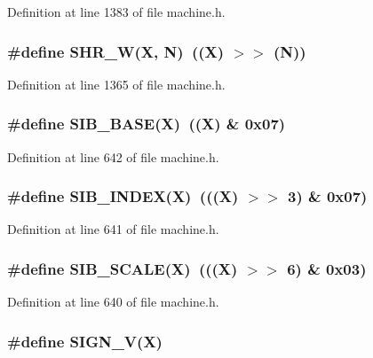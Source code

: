 Definition at line 1383 of file machine.h.
\subsubsection[{SHR\_\-W}]{\setlength{\rightskip}{0pt plus 5cm}\#define SHR\_\-W(X, \/  N)~((X) $>$$>$ (N))}\label{machine_8h_cb13dcce0ac5ee1b827044c4bdcb8525}




Definition at line 1365 of file machine.h.
\subsubsection[{SIB\_\-BASE}]{\setlength{\rightskip}{0pt plus 5cm}\#define SIB\_\-BASE(X)~((X) \& 0x07)}\label{machine_8h_de13ecc82253b38c787f765bc05ffcb6}




Definition at line 642 of file machine.h.
\subsubsection[{SIB\_\-INDEX}]{\setlength{\rightskip}{0pt plus 5cm}\#define SIB\_\-INDEX(X)~(((X) $>$$>$ 3) \& 0x07)}\label{machine_8h_9fa465ac29c1acd47dbbc4e2ef62c5be}




Definition at line 641 of file machine.h.
\subsubsection[{SIB\_\-SCALE}]{\setlength{\rightskip}{0pt plus 5cm}\#define SIB\_\-SCALE(X)~(((X) $>$$>$ 6) \& 0x03)}\label{machine_8h_e07e81496112bf371a6ff7f054441944}




Definition at line 640 of file machine.h.
\subsubsection[{SIGN\_\-V}]{\setlength{\rightskip}{0pt plus 5cm}\#define SIGN\_\-V(X)}\label{machine_8h_4100b854e931f3949c3597464f715649}


